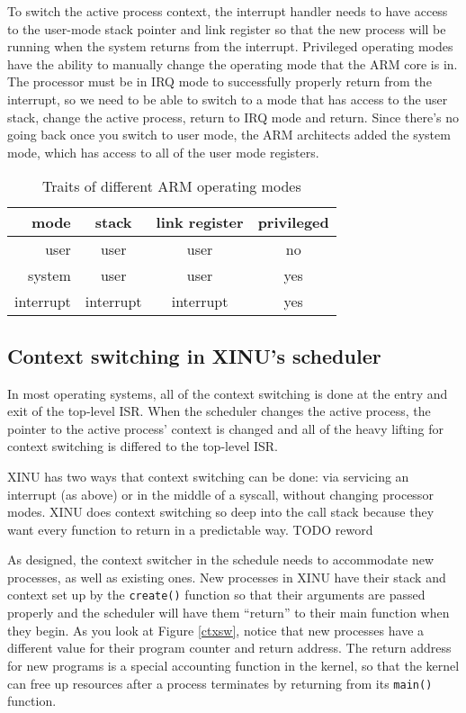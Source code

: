 \documentclass[12pt]{article}
\newcommand{\TODO}[1]{{\huge\color{red}TODO \Large #1}}
\newcommand{\code}[1]{{\tt #1}}
\begin{document}
To switch the active process context, the interrupt handler needs to have
access to the user-mode stack pointer and link register so that the new process
will be running when the system returns from the interrupt.  Privileged
operating modes have the ability to manually change the operating mode that the
ARM core is in. The processor must be in IRQ mode to successfully properly
return from the interrupt, so we need to be able to switch to a mode that has
access to the user stack, change the active process, return to IRQ mode and
return. Since there's no going back once you switch to user mode, the ARM
architects added the system mode, which has access to all of the user mode
registers.

\begin{table}[h]
\caption{Traits of different ARM operating modes}
\label{arm-modes}
\center
\begin{tabular}{| r || c | c | c |}
\hline
mode & stack & link register & privileged \\\hline\hline
user & user & user & no \\\hline
system & user & user & yes \\\hline
interrupt & interrupt & interrupt & yes \\\hline
\end{tabular}
\end{table}

\subsection{Context switching in XINU's scheduler}
In most operating systems, all of the context switching is done at the entry
and exit of the top-level ISR. When the scheduler changes the active process,
the pointer to the active process' context is changed and all of the heavy
lifting for context switching is differed to the top-level ISR.

XINU has two ways that context switching can be done: via servicing an
interrupt (as above) or in the middle of a syscall, without changing processor
modes. XINU does context switching so deep into the call stack because they
want every function to return in a predictable way. \TODO{reword}

As designed, the context switcher in the schedule needs to accommodate new
processes, as well as existing ones. New processes in XINU have their stack and
context set up by the \code{create()} function so that their arguments are
passed properly and the scheduler will have them ``return'' to their main
function when they begin. As you look at Figure \ref{ctxsw}, notice that new
processes have a different value for their program counter and return address.
The return address for new programs is a special accounting function in the
kernel, so that the kernel can free up resources after a process terminates by
returning from its \code{main()} function.
\end{document}
